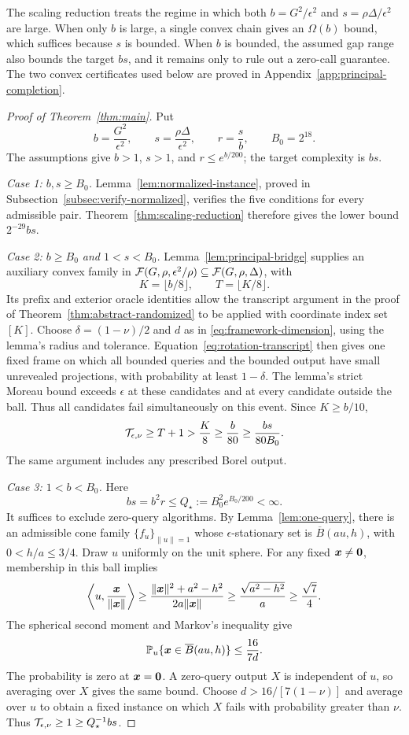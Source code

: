 The scaling reduction treats the regime in which both
$b=G^2/\epsilon^2$ and $s=\rho\Delta/\epsilon^2$ are large.
When only $b$ is large, a single convex chain gives an
$\Omega(b)$ bound, which suffices because $s$ is bounded.
When $b$ is bounded, the assumed gap range also bounds the target
$bs$, and it remains only to rule out a zero-call guarantee.
The two convex certificates used below are proved in
Appendix~\ref{app:principal-completion}.
\begin{proof}[Proof of Theorem~\ref{thm:main}]
Put
\[
 b=\frac{G^2}{\epsilon^2},\qquad
 s=\frac{\rho\Delta}{\epsilon^2},\qquad
 r=\frac sb,\qquad B_0=2^{18}.
\]
The assumptions give $b>1$, $s>1$, and $r\le e^{b/200}$;
the target complexity is $bs$.

\emph{Case 1: $b,s\ge B_0$.}
Lemma~\ref{lem:normalized-instance}, proved in
Subsection~\ref{subsec:verify-normalized}, verifies the five conditions
for every admissible pair.
Theorem~\ref{thm:scaling-reduction} therefore gives the lower bound
$2^{-29}bs$.

\emph{Case 2: $b\ge B_0$ and $1<s<B_0$.}
Lemma~\ref{lem:principal-bridge} supplies an auxiliary convex
family in ${\cal F}(G,\rho,\epsilon^2/\rho)\subseteq{\cal F}(G,\rho,\Delta)$,
with
\[
 K=\lfloor b/8\rfloor,\qquad T=\lfloor K/8\rfloor.
\]
Its prefix and exterior oracle identities allow the transcript
argument in the proof of Theorem~\ref{thm:abstract-randomized}
to be applied with coordinate index set $[K]$.
Choose $\delta=(1-\nu)/2$ and $d$ as in
\eqref{eq:framework-dimension}, using the lemma's radius and
tolerance. Equation~\eqref{eq:rotation-transcript} then gives
one fixed frame on which all bounded queries and the bounded
output have small unrevealed projections, with probability
at least $1-\delta$. The lemma's strict Moreau bound exceeds
$\epsilon$ at these candidates and at every candidate outside
the ball. Thus all candidates fail simultaneously on this event.
Since $K\ge b/10$,
\[
 {\cal T}_{\epsilon,\nu}\ge T+1>\frac K8
 \ge\frac b{80}\ge\frac{bs}{80B_0}.
\]
The same argument includes any prescribed Borel output.

\emph{Case 3: $1<b<B_0$.}
Here
\[
 bs=b^2r\le Q_\star:=B_0^2e^{B_0/200}<\infty.
\]
It suffices to exclude zero-query algorithms. By
Lemma~\ref{lem:one-query}, there is an admissible cone family
$\{f_u\}_{\|u\|=1}$ whose $\epsilon$-stationary set is
$\overline B(au,h)$, with $0<h/a\le3/4$.
Draw $u$ uniformly on the unit sphere. For any fixed $\bm{x}\ne{\mathbf 0}$,
membership in this ball implies
\[
 \left\langle u,\frac{\bm{x}}{\|\bm{x}\|}\right\rangle
 \ge\frac{\|\bm{x}\|^2+a^2-h^2}{2a\|\bm{x}\|}
 \ge\frac{\sqrt{a^2-h^2}}a\ge\frac{\sqrt7}{4}.
\]
The spherical second moment and Markov's inequality give
\[
 \mathbb P_u\{\bm{x}\in\overline B(au,h)\}
 \le\frac{16}{7d}.
\]
The probability is zero at $\bm{x}={\mathbf 0}$. A zero-query output $X$
is independent of $u$, so averaging over $X$ gives the same bound.
Choose $d>16/[7(1-\nu)]$ and average over $u$ to obtain a fixed
instance on which $X$ fails with probability greater than $\nu$.
Thus ${\cal T}_{\epsilon,\nu}\ge1\ge Q_\star^{-1}bs$.


\end{proof}
